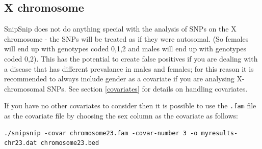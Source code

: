 \documentclass[a4paper,12pt]{article}
\newcommand{\code}[1]{{\footnotesize{{\tt #1}}}}
\begin{document}

\subsection{X chromosome}
\label{X-chromosome}

SnipSnip does not do anything special with the analysis of SNPs on the X chromosome - the SNPs will be treated as if they were autosomal. (So females will end up with genotypes coded 0,1,2 and males will end up with genotypes coded 0,2). This has the potential to create false positives if you are dealing with a disease that has different prevalance in males and females; for this reason it is recommended to always include gender as a covariate if you are analysing X-chromosomal SNPs. See  section \ref{covariates} for details on handling covariates. 

If you have no other covariates to consider then it is possible to use the \code{.fam} file as the covariate file by choosing the sex column as the covariate as follows: 
\begin{verbatim}
./snipsnip -covar chromosome23.fam -covar-number 3 -o myresults-chr23.dat chromosome23.bed
\end{verbatim}






\end{document}
